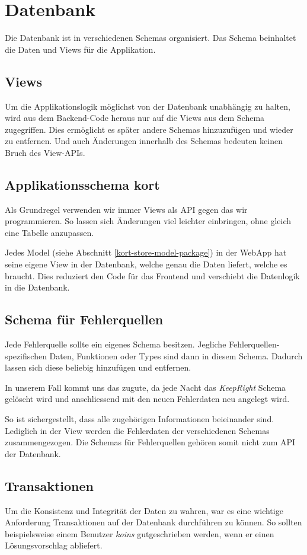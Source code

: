 \section{Datenbank}
Die Datenbank ist in verschiedenen Schemas organisiert.
Das Schema  beinhaltet die Daten und Views für die Applikation.

\subsection{Views}
Um die Applikationslogik möglichst von der Datenbank unabhängig zu halten, wird aus dem Backend-Code heraus nur auf die Views aus dem Schema  zugegriffen.
Dies ermöglicht es später andere Schemas hinzuzufügen und wieder zu entfernen.
Und auch Änderungen innerhalb des Schemas bedeuten keinen Bruch des View-\glspl{API}.

\subsection{Applikationsschema kort}
Als Grundregel verwenden wir immer Views als \gls{API} gegen das wir programmieren.
So lassen sich Änderungen viel leichter einbringen, ohne gleich eine Tabelle anzupassen.

Jedes Model (siehe Abschnitt \ref{kort-store-model-package})  in der \gls{WebApp} hat seine eigene View in der Datenbank, welche genau die Daten liefert, welche es braucht.
Dies reduziert den Code für das Frontend und verschiebt die Datenlogik in die Datenbank.

\subsection{Schema für Fehlerquellen}
Jede Fehlerquelle sollte ein eigenes Schema besitzen.
Jegliche Fehlerquellen-spezifischen Daten, Funktionen oder Types sind dann in diesem Schema.
Dadurch lassen sich diese beliebig hinzufügen und entfernen.

In unserem Fall kommt uns das zugute, da jede Nacht das \emph{KeepRight} Schema gelöscht wird und anschliessend mit den neuen Fehlerdaten neu angelegt wird.

So ist sichergestellt, dass alle zugehörigen Informationen beieinander sind.
Lediglich in der View  werden die Fehlerdaten der verschiedenen Schemas zusammengezogen.
Die Schemas für Fehlerquellen gehören somit nicht zum \gls{API} der Datenbank.

\subsection{Transaktionen}
Um die Konsistenz und Integrität der Daten zu wahren, war es eine wichtige Anforderung Transaktionen auf der Datenbank durchführen zu können.
So sollten beispielsweise einem Benutzer \emph{koins} gutgeschrieben werden, wenn er einen Lösungsvorschlag abliefert.

